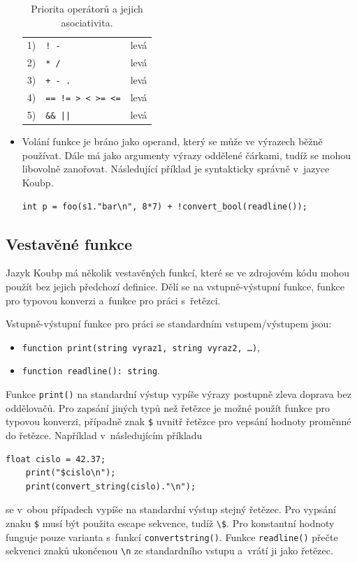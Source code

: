 \begin{itemize}
\begin{table}[ht]
\begin{tabularx}{0.7\textwidth}{p{}p{}X}
            \midrule
            1) & \texttt{! -} & levá \\
            2) & \texttt{* /} & levá \\
            3) & \texttt{+ - .} & levá \\
            4) & \texttt{== != > < >= <=} & levá \\
            5) & \texttt{\&\& ||} & levá \\
            \bottomrule
        \end{tabularx}
        \caption{Priorita operátorů a jejich asociativita.}
        \label{tab_priorita_operatoru}
    \end{table}
    \item Volání funkce je bráno jako operand, který se může ve výrazech běžně používat.
    Dále má jako argumenty výrazy oddělené čárkami, tudíž se mohou libovolně zanořovat.
    Následující příklad je syntakticky správně v~jazyce Koubp.
    \begin{lstlisting}[language=Koubp]
        int p = foo(s1."bar\n", 8*7) + !convert_bool(readline());
    \end{lstlisting}
\end{itemize}

\subsection*{Vestavěné funkce}
Jazyk Koubp má několik vestavěných funkcí, které se ve zdrojovém kódu mohou použít bez jejich předchozí definice.
Dělí se na vstupně-výstupní funkce, funkce pro typovou konverzi a~funkce pro práci s~řetězci.

Vstupně-výstupní funkce pro práci se standardním vstupem/výstupem jsou:
\begin{itemize}
    \item \texttt{function print(string vyraz1, string vyraz2, \ldots)},
    \item \texttt{function readline(): string}.
\end{itemize}
Funkce \texttt{print()} na standardní výstup vypíše výrazy postupně zleva doprava bez oddělovačů.
Pro zapsání jiných typů než řetězce je možné použít funkce pro typovou konverzi, případně znak \texttt{\$} uvnitř řetězce pro vepsání hodnoty proměnné do řetězce.
Například v~následujícím příkladu
\begin{lstlisting}[language=Koubp]
    float cislo = 42.37;
    print("$cislo\n");
    print(convert_string(cislo)."\n");
\end{lstlisting}
se v~obou případech vypíše na standardní výstup stejný řetězec.
Pro vypsání znaku \texttt{\$} musí být použita escape sekvence, tudíž \texttt{\textbackslash\$}.
Pro konstantní hodnoty funguje pouze varianta s~funkcí \texttt{convert\textunderscore string()}.
Funkce \texttt{readline()} přečte sekvenci znaků ukončenou \texttt{\textbackslash n} ze standardního vstupu a~vrátí ji jako řetězec.

